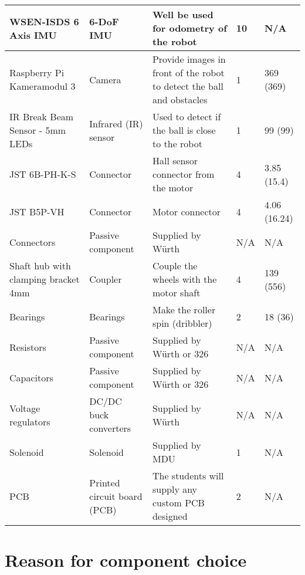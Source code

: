 \documentclass[a4paper,12pt]{article}
\begin{document}
\begin{centering}
\begin{longtable}{|p{3cm}|p{3cm}|p{3cm}|p{1cm}|p{2cm}| }
        \hline
        WSEN-ISDS 6 Axis IMU & 6-DoF IMU & Well be used for odometry of the robot & 10 & N/A\\
        \hline
        Raspberry Pi Kameramodul 3 & Camera & Provide images in front of the robot to detect the ball and obstacles & 1 & 369 (369) \\
        \hline
        IR Break Beam Sensor - 5mm LEDs & Infrared (IR) sensor & Used to detect if the ball is close to the robot & 1 & 99 (99) \\
        \hline
        JST 6B-PH-K-S & Connector & Hall sensor connector from the motor & 4 & 3.85 (15.4) \\
        \hline
        JST B5P-VH & Connector & Motor connector & 4 & 4.06 (16.24) \\
        \hline
        Connectors & Passive component & Supplied by Würth & N/A & N/A \\
        \hline
        Shaft hub with clamping bracket 4mm & Coupler & Couple the wheels with the motor shaft & 4 & 139 (556) \\
        \hline
        Bearings & Bearings & Make the roller spin (dribbler) & 2 & 18 (36)\\
        \hline
        Resistors & Passive component & Supplied by Würth or 326 & N/A & N/A \\
        \hline
        Capacitors & Passive component & Supplied by Würth or 326 & N/A & N/A \\
        \hline
        Voltage regulators & DC/DC buck converters & Supplied by Würth & N/A & N/A \\
        \hline
        Solenoid & Solenoid & Supplied by MDU & 1 & N/A \\
        \hline
        PCB & Printed circuit board (PCB) & The students will supply any custom PCB designed & 2 & N/A\\
        \hline

\end{longtable}
\end{centering}

\section*{Reason for component choice}
\end{document}
